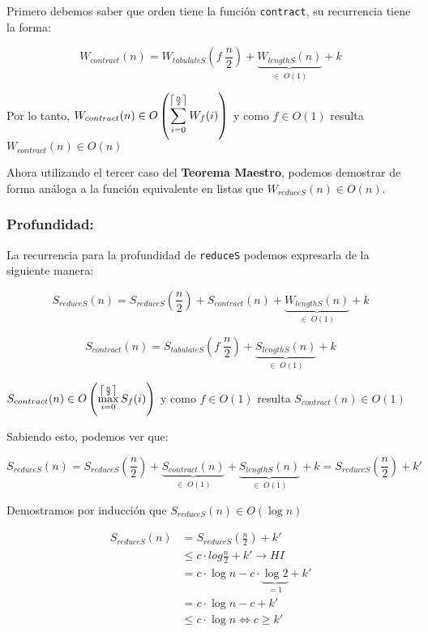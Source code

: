 \documentclass[11pt]{article}
\DeclarePairedDelimiter{\ceil}{\lceil}{\rceil}
\begin{document}
Primero debemos saber que orden tiene la función \texttt{contract}, su recurrencia
tiene la forma:

\begin{equation*}
    W_{contract}(n) = W_{tabulateS}(f \; \frac{n}{2}) + \underbrace{W_{lengthS}(n)}_{\in \; O(1)} + k
\end{equation*}

Por lo tanto, $W_{contract}(n) \in O\left(\displaystyle\sum_{i=0}^{\ceil*{\frac{n}{2}}}W_f(i)\right) $
y como $f\in O(1)$ resulta $W_{contract}(n) \in O(n)$

Ahora utilizando el tercer caso del \textbf{Teorema Maestro}, podemos 
demostrar de forma análoga a la función equivalente en listas que
$W_{reduceS}(n) \in O(n)$.

\subsubsection{Profundidad:}

La recurrencia para la profundidad de \texttt{reduceS} podemos expresarla de la siguiente manera:

\begin{equation*}
    S_{reduceS}(n) =  S_{reduceS}(\frac{n}{2}) + S_{contract}(n) + \underbrace{W_{lengthS}(n)}_{\in \; O(1)} + k
\end{equation*}

\begin{equation*}
    S_{contract}(n) = S_{tabulateS}(f \; \frac{n}{2}) + \underbrace{S_{lengthS}(n)}_{\in \; O(1)} + k
\end{equation*}

$S_{contract}(n) \in O\left(\displaystyle\max_{i=0}^{\ceil*{\frac{n}{2}}}S_f(i)\right) $
y como $f\in O(1)$ resulta $S_{contract}(n) \in O(1)$

Sabiendo esto, podemos ver que:

\begin{equation*}
    S_{reduceS}(n) =  S_{reduceS}(\frac{n}{2}) +  \underbrace{S_{contract}(n) }_{\in \; O(1)} +
    \underbrace{S_{lengthS}(n)}_{\in \; O(1)} + k =  S_{reduceS}(\frac{n}{2}) + k'
\end{equation*}

Demostramos por inducción que $S_{reduceS}(n) \in O(\log{n})$

\begin{align*}
    S_{reduceS}(n) & = S_{reduceS}(\frac{n}{2}) + k' \\
                   & \leq c \cdot log{\frac{n}{2}} + k' \rightarrow HI\\
                   & = c \cdot \log{n} - c \cdot \underbrace{\log{2}}_{= 1} + k' \\
                   & = c \cdot \log{n} - c + k' \\
                   & \leq c \cdot \log{n} \iff c \geq k'
\end{align*}
\end{document}

